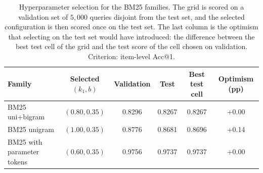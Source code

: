 \begin{table}[ht]
\centering
\caption{Hyperparameter selection for the BM25 families. The grid is scored on a validation set of $5{,}000$ queries disjoint from the test set, and the selected configuration is then scored once on the test set. The last column is the optimism that selecting on the test set would have introduced: the difference between the best test cell of the grid and the test score of the cell chosen on validation. Criterion: item-level Acc@1.}
\label{tab:validation_selection}
\begin{tabular}{lccccc}
\toprule
\textbf{Family} & \textbf{Selected $(k_1, b)$} & \textbf{Validation} & \textbf{Test} & \textbf{Best test cell} & \textbf{Optimism (pp)} \\
\midrule
BM25 uni+bigram & $(0.80, 0.35)$ & 0.8296 & 0.8267 & 0.8267 & +0.00 \\
BM25 unigram & $(1.00, 0.35)$ & 0.8776 & 0.8681 & 0.8696 & +0.14 \\
BM25 with parameter tokens & $(0.60, 0.35)$ & 0.9756 & 0.9737 & 0.9737 & +0.00 \\
\bottomrule
\end{tabular}
\end{table}
